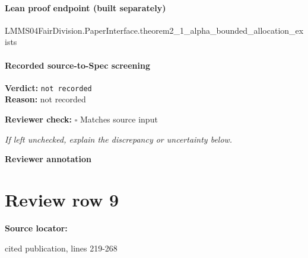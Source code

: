 \documentclass[10pt]{article}
\newcommand{\reviewerbox}{%
  \par\noindent\fbox{\parbox{0.96\linewidth}{\rule{0pt}{0.38in}}}\par
}
\newcommand{\reviewmatch}[1]{%
  \par\noindent\textbf{Reviewer check:} $\square$\; #1\par
  \noindent\emph{If left unchecked, explain the discrepancy or uncertainty below.}\par
}
\begin{document}
\paragraph{Lean proof endpoint (built separately)}\begin{ReviewVerbatim}
LMMS04FairDivision.PaperInterface.theorem2_1_alpha_bounded_allocation_exists
\end{ReviewVerbatim}

\paragraph{Recorded source-to-Spec screening}
\textbf{Verdict:} \texttt{not recorded}
\\
\textbf{Reason:} not recorded
\reviewmatch{Matches source input}
\noindent\textbf{Reviewer annotation}\par
\reviewerbox
\clearpage
\hypertarget{source-claim-d94f2abb19eceeb5}{}
\section*{Review row 9}
\textbf{Source locator:} {\footnotesize\raggedright cited publication, lines 219-\allowbreak{}268\par}
\end{document}
